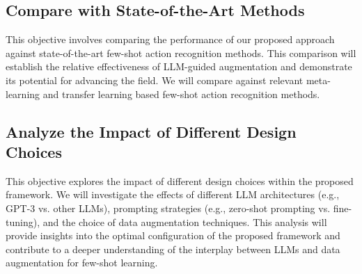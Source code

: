\subsection{Compare with State-of-the-Art Methods} 
This objective involves comparing the performance of our proposed approach against state-of-the-art few-shot action recognition methods. This comparison will establish the relative effectiveness of LLM-guided augmentation and demonstrate its potential for advancing the field. We will compare against relevant meta-learning and transfer learning based few-shot action recognition methods.

\subsection{Analyze the Impact of Different Design Choices} 

This objective explores the impact of different design choices within the proposed framework. We will investigate the effects of different LLM architectures (e.g., GPT-3 vs. other LLMs), prompting strategies (e.g., zero-shot prompting vs. fine-tuning), and the choice of data augmentation techniques. This analysis will provide insights into the optimal configuration of the proposed framework and contribute to a deeper understanding of the interplay between LLMs and data augmentation for few-shot learning.

